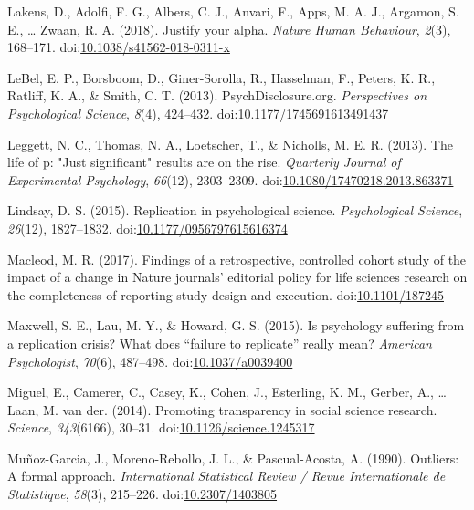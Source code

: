 \documentclass[english,,man]{apa6}
\begin{document}
\leavevmode\hypertarget{ref-Lakens2018}{}%
Lakens, D., Adolfi, F. G., Albers, C. J., Anvari, F., Apps, M. A. J., Argamon, S. E., \ldots{} Zwaan, R. A. (2018). Justify your alpha. \emph{Nature Human Behaviour}, \emph{2}(3), 168--171. doi:\href{https://doi.org/10.1038/s41562-018-0311-x}{10.1038/s41562-018-0311-x}

\leavevmode\hypertarget{ref-LeBel2013}{}%
LeBel, E. P., Borsboom, D., Giner-Sorolla, R., Hasselman, F., Peters, K. R., Ratliff, K. A., \& Smith, C. T. (2013). PsychDisclosure.org. \emph{Perspectives on Psychological Science}, \emph{8}(4), 424--432. doi:\href{https://doi.org/10.1177/1745691613491437}{10.1177/1745691613491437}

\leavevmode\hypertarget{ref-Leggett}{}%
Leggett, N. C., Thomas, N. A., Loetscher, T., \& Nicholls, M. E. R. (2013). The life of p: "Just significant" results are on the rise. \emph{Quarterly Journal of Experimental Psychology}, \emph{66}(12), 2303--2309. doi:\href{https://doi.org/10.1080/17470218.2013.863371}{10.1080/17470218.2013.863371}

\leavevmode\hypertarget{ref-Lindsay2015}{}%
Lindsay, D. S. (2015). Replication in psychological science. \emph{Psychological Science}, \emph{26}(12), 1827--1832. doi:\href{https://doi.org/10.1177/0956797615616374}{10.1177/0956797615616374}

\leavevmode\hypertarget{ref-Macleod2017}{}%
Macleod, M. R. (2017). Findings of a retrospective, controlled cohort study of the impact of a change in Nature journals' editorial policy for life sciences research on the completeness of reporting study design and execution. doi:\href{https://doi.org/10.1101/187245}{10.1101/187245}

\leavevmode\hypertarget{ref-Maxwell2015}{}%
Maxwell, S. E., Lau, M. Y., \& Howard, G. S. (2015). Is psychology suffering from a replication crisis? What does ``failure to replicate'' really mean? \emph{American Psychologist}, \emph{70}(6), 487--498. doi:\href{https://doi.org/10.1037/a0039400}{10.1037/a0039400}

\leavevmode\hypertarget{ref-Miguel2014}{}%
Miguel, E., Camerer, C., Casey, K., Cohen, J., Esterling, K. M., Gerber, A., \ldots{} Laan, M. van der. (2014). Promoting transparency in social science research. \emph{Science}, \emph{343}(6166), 30--31. doi:\href{https://doi.org/10.1126/science.1245317}{10.1126/science.1245317}

\leavevmode\hypertarget{ref-Munoz-Garcia1990}{}%
Muñoz-Garcia, J., Moreno-Rebollo, J. L., \& Pascual-Acosta, A. (1990). Outliers: A formal approach. \emph{International Statistical Review / Revue Internationale de Statistique}, \emph{58}(3), 215--226. doi:\href{https://doi.org/10.2307/1403805}{10.2307/1403805}
\end{document}
